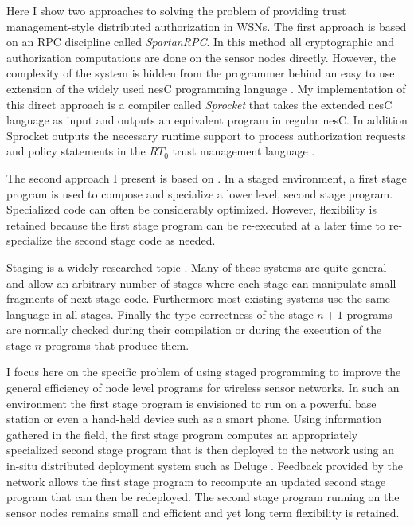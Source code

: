 Here I show two approaches to solving the problem of providing trust management-style
distributed authorization in WSNs. The first approach is based on an RPC discipline called
\textit{SpartanRPC}. In this method all cryptographic and authorization computations are done on
the sensor nodes directly. However, the complexity of the system is hidden from the programmer
behind an easy to use extension of the widely used nesC programming language
\cite{Gay-nesC-2003}. My implementation of this direct approach is a compiler called
\textit{Sprocket} that takes the extended nesC language as input and outputs an equivalent
program in regular nesC. In addition Sprocket outputs the necessary runtime support to process
authorization requests and policy statements in the $RT_0$ trust management language
\cite{Li:DRBTMF,Li:RRBTMF}.

The second approach I present is based on . In a staged environment,
a first stage program is used to compose and specialize a lower level, second stage program.
Specialized code can often be considerably optimized. However, flexibility is retained because
the first stage program can be re-executed at a later time to re-specialize the second stage
code as needed.

Staging is a widely researched topic
\cite{Taha-MetaML,Sheard-TemplateHaskell,Mainland-Flask-2008,FramedML}.  Many of these systems are quite general and allow an
arbitrary number of stages where each stage can manipulate small fragments of next-stage code.
Furthermore most existing systems  use the same language in all stages.
Finally the type correctness of the stage $n+1$ programs are normally checked during their
compilation or during the execution of the stage $n$ programs that produce them.

I focus here on the specific problem of using staged programming to improve the general
efficiency of node level programs for wireless sensor networks. In such an environment the first
stage program is envisioned to run on a powerful base station or even a hand-held device such as
a smart phone. Using information gathered in the field, the first stage program computes an
appropriately specialized second stage program that is then deployed to the network using an
in-situ distributed deployment system such as Deluge \cite{XXX}. Feedback provided by the
network allows the first stage program to recompute an updated second stage program that can
then be redeployed. The second stage program running on the sensor nodes remains small and
efficient and yet long term flexibility is retained.


